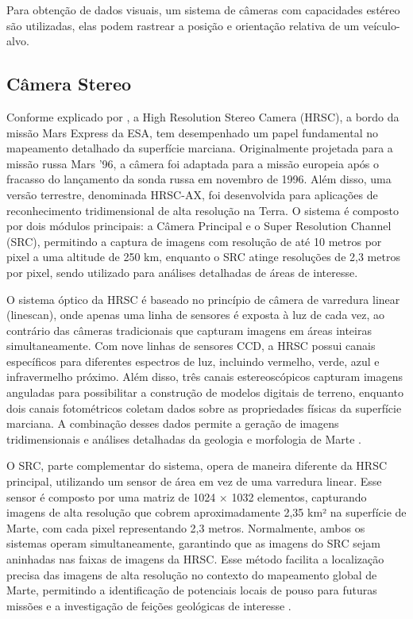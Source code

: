 Para obtenção de dados visuais, um sistema de câmeras com capacidades estéreo são utilizadas, elas podem rastrear a posição e orientação relativa de um veículo-alvo.

\subsection{Câmera Stereo}

Conforme explicado por \cite{esaMarsExpress}, a High Resolution Stereo Camera (HRSC), a bordo da missão Mars Express da ESA, tem desempenhado um papel fundamental no mapeamento detalhado da superfície marciana. Originalmente projetada para a missão russa Mars '96, a câmera foi adaptada para a missão europeia após o fracasso do lançamento da sonda russa em novembro de 1996. Além disso, uma versão terrestre, denominada HRSC-AX, foi desenvolvida para aplicações de reconhecimento tridimensional de alta resolução na Terra. O sistema é composto por dois módulos principais: a Câmera Principal e o Super Resolution Channel (SRC), permitindo a captura de imagens com resolução de até 10 metros por pixel a uma altitude de 250 km, enquanto o SRC atinge resoluções de 2,3 metros por pixel, sendo utilizado para análises detalhadas de áreas de interesse.

O sistema óptico da HRSC é baseado no princípio de câmera de varredura linear (linescan), onde apenas uma linha de sensores é exposta à luz de cada vez, ao contrário das câmeras tradicionais que capturam imagens em áreas inteiras simultaneamente. Com nove linhas de sensores CCD, a HRSC possui canais específicos para diferentes espectros de luz, incluindo vermelho, verde, azul e infravermelho próximo. Além disso, três canais estereoscópicos capturam imagens anguladas para possibilitar a construção de modelos digitais de terreno, enquanto dois canais fotométricos coletam dados sobre as propriedades físicas da superfície marciana. A combinação desses dados permite a geração de imagens tridimensionais e análises detalhadas da geologia e morfologia de Marte \cite{esaMarsExpress}.

O SRC, parte complementar do sistema, opera de maneira diferente da HRSC principal, utilizando um sensor de área em vez de uma varredura linear. Esse sensor é composto por uma matriz de 1024 × 1032 elementos, capturando imagens de alta resolução que cobrem aproximadamente 2,35 km² na superfície de Marte, com cada pixel representando 2,3 metros. Normalmente, ambos os sistemas operam simultaneamente, garantindo que as imagens do SRC sejam aninhadas nas faixas de imagens da HRSC. Esse método facilita a localização precisa das imagens de alta resolução no contexto do mapeamento global de Marte, permitindo a identificação de potenciais locais de pouso para futuras missões e a investigação de feições geológicas de interesse \cite{esaMarsExpress}.
